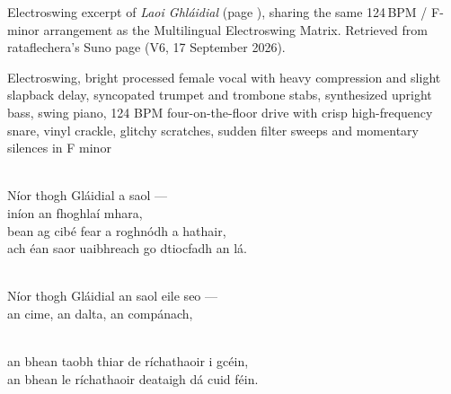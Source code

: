 
\begin{notes}
Electroswing excerpt of \emph{Laoi Ghláidial} (page \pageref{sec:laoi-ghlaidial}), sharing the same 124\,BPM / F-minor arrangement as the Multilingual Electroswing Matrix. Retrieved from rataflechera's Suno page (V6, 17 September 2026).
\end{notes}
\begin{style}
Electroswing, bright processed female vocal with heavy compression and slight slapback delay, syncopated trumpet and trombone stabs, synthesized upright bass, swing piano, 124 BPM four-on-the-floor drive with crisp high-frequency snare, vinyl crackle, glitchy scratches, sudden filter sweeps and momentary silences in F minor
\end{style}
\begin{lyrics}
\\
Níor thogh Gláidial a saol —
\\
iníon an fhoghlaí mhara,
\\
bean ag cibé fear a roghnódh a hathair,\\
ach éan saor uaibhreach go dtiocfadh an lá.

\\
Níor thogh Gláidial an saol eile seo —\\
an cime, an dalta, an compánach,

\\
an bhean taobh thiar de ríchathaoir i gcéin,\\
an bhean le ríchathaoir deataigh dá cuid féin.
\end{lyrics}

